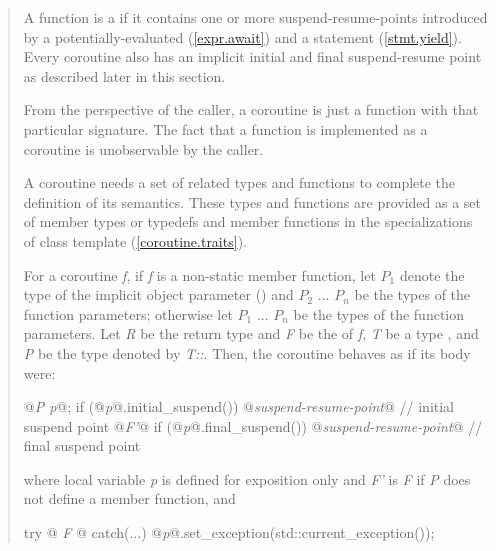 \begin{quote}
\pnum
A function is a  if it contains
one or more suspend-resume-points introduced by a potentially-evaluated  (\ref{expr.await}) and a  statement (\ref{stmt.yield}).
Every coroutine
also has an implicit initial and final suspend-resume point as described later in this section. 


\pnum
\enternote
From the perspective of the caller, a coroutine is just a function with that particular signature. The fact that a function is implemented as a coroutine is unobservable by the caller. 
\exitnote

\pnum
A coroutine needs a set of related types and functions
to complete the definition of its semantics.
These types and functions are provided as a set of member types or typedefs
and member functions in the specializations of class template
 (\ref{coroutine.traits}). 

\pnum
For a coroutine \textit{f}, if 
\textit{f} is a non-static member function, let $P_1$ denote the type of the implicit object parameter () and $P_2$ ... $P_n$ be the types of the function parameters; otherwise let $P_1$ ... $P_n$ be the types of the function parameters.
Let \textit{R} be the return type and \textit{F} be the 
of \textit{f}, \textit{T} be a type , and \textit{P} be the type denoted by \textit{T::}. 
Then, the coroutine behaves as if its body were:
\begin{codeblock}
  {
     @\textit{P p}@;
     if (@\textit{p}@.initial_suspend()) {
       @\textit{suspend-resume-point}@ // initial suspend point
     }
     @\textit{F'}@
     if (@\textit{p}@.final_suspend()) {
       @\textit{suspend-resume-point}@ // final suspend point
     }
  }
\end{codeblock}
where local variable \textit{p} is 
defined for
exposition only and
\textit{F'} is \textit{F}
if \textit{P} does not define a  member function, 
and 
\begin{codeblock}
  try {@\textit{ F }@} catch(...) { @\textit{p}@.set_exception(std::current_exception()); }
\end{codeblock}


\end{quote}
